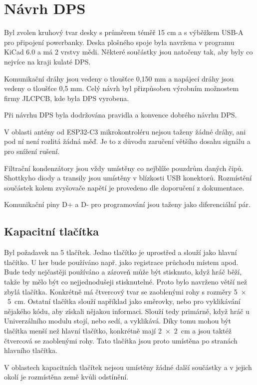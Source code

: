 \chapter{Návrh DPS}
Byl zvolen kruhový tvar desky s průměrem téměř 15 cm a s výběžkem USB-A pro připojení powerbanky. Deska plošného spoje byla navržena v programu KiCad 6.0 a má 2 vrstvy mědi. 
Některé součástky jsou natočeny tak, aby byly co nejvíce na kraji kulaté DPS.

Komunikační dráhy jsou vedeny o tloušťce 0,150 mm a napájecí dráhy jsou vedeny o tloušťce 0,5 mm. Celý návrh byl přizpůsoben výrobním možnostem firmy JLCPCB, kde byla DPS vyrobena.

Při návrhu DPS byla dodržována pravidla a konvence dobrého návrhu DPS.

V oblasti antény od ESP32-C3 mikrokontroléru nejsou taženy žádné dráhy, ani pod ní není rozlitá žádná měď. Je to z důvodu zaručení většího dosahu signálu a pro snížení rušení. 

Filtrační kondenzátory jsou vždy umístěny co nejblíže pouzdrům daných čipů. Shottkyho diody a transily jsou umístěny v blízkosti USB konektorů. Rozmístění součástek kolem zvyšovače napětí 
je provedeno dle doporučení z dokumentace. 

Komunikační piny D+ a D- pro programování jsou taženy jako diferenciální pár.

\section{Kapacitní tlačítka} 
Byl požadavek na 5 tlačítek. Jedno tlačítko je uprostřed a slouží jako hlavní tlačítko. U her bude používáno např. jako registrace průchodu místem apod. Bude tedy nejčastěji
používáno a zároveň může být stisknuto, když hráč běží, takže by mělo být co nejjednodušeji stisknutelné. Proto bylo navrženo větší než zbylá tlačítka. Konkrétně má 
čtvercový tvar se zaoblenými rohy s rozměry 5~$\times$~5~cm. Ostatní tlačítka slouží například jako směrovky, nebo pro vyklikávání nějakého kódu, aby získali nějakou informaci. 
Slouží tedy primárně, když hráč u Univerzálního modulu stojí, nebo sedí, a vyklikává. Díky tomu mohou být tlačítka menší než hlavní tlačítko, konkrétně mají 2~$\times$~2~cm 
a jsou taktéž čtvercová se zaoblenými rohy. Tato tlačítka jsou proto umístěna po stranách hlavního tlačítka.

V oblastech kapacitních tlačítek nejsou umístěny žádné další součástky a v jejich okolí je rozmístěna země kvůli odstínění. 

